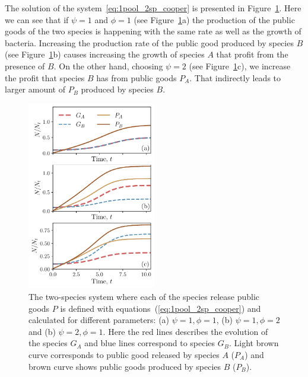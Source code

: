 \documentclass[10pt,A4paper]{article}
\begin{document}
%
The solution of the system~\ref{eq:1pool_2sp_cooper} is presented in Figure~\ref{fig:1pool_2sp_cooper}.
Here we can see that if $\psi=1$ and $\phi=1$ (see Figure~\ref{fig:1pool_2sp_cooper}a) the production of the public goods of the two species is happening with the same rate as well as the growth of bacteria.
Increasing the production rate of the public good produced by species $B$ (see Figure~\ref{fig:1pool_2sp_cooper}b) causes increasing the growth of species $A$ that profit from the presence of $B$.
On the other hand, choosing $\psi=2$ (see Figure~\ref{fig:1pool_2sp_cooper}c), we increase the profit that species $B$ has from public goods $P_A$.
That indirectly leads to larger amount of $P_B$ produced by species $B$.
\begin{figure}[H]
    \begin{center}
    \includegraphics[width=0.5\textwidth]{Figures/pool_model_2sp_1pool_coop.pdf}
    \caption{
        The two-species system where each of the species release public goods $P$ is defined with equations~(\ref{eq:1pool_2sp_cooper}) and calculated for different parameters:
        (a) $\psi=1, \phi=1$, (b) $\psi=1, \phi=2$ and (b) $\psi=2, \phi=1$.
        Here the red lines describes the evolution of the species $G_A$ and blue lines correspond to species $G_B$.
        Light brown curve corresponds to public good released by species $A$ ($P_A$) and brown curve shows public goods produced by species $B$ ($P_B$).
    }
    \label{fig:1pool_2sp_cooper}
    \end{center}
\end{figure}
%
%
%
%
\end{document}

